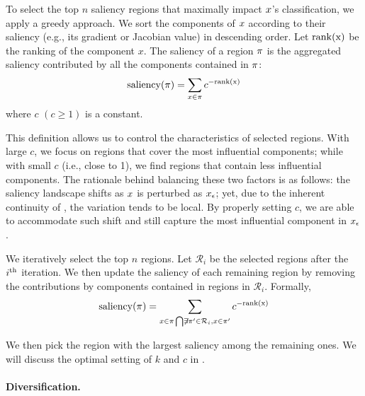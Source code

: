 To select the top $n$ saliency regions that maximally impact $x$'s classification, we apply a greedy approach.
We sort the components of $x$ according to their saliency (e.g., its gradient or Jacobian value) in descending order. Let $\rm{rank}(x)$ be the ranking of the component $x$. The saliency of a region $\pi$ is the aggregated saliency contributed by all the components contained in $\pi$:
\begin{displaymath}
{\rm saliency}(\pi) = \sum_{x \in \pi} c^{-\rm{rank}(x)}
\end{displaymath}
where $c$ $(c \geq 1)$ is a constant.

This definition allows us to control the characteristics of selected regions. With large $c$, we focus on regions that cover the most influential components; while with small $c$ (i.e., close to 1), we find regions that contain less influential components. The rationale behind balancing these two factors is as follows: the saliency landscape shifts as $x$ is perturbed as $x_{\epsilon}$; yet, due to the inherent continuity of \dnns, the variation tends to be local. By properly setting $c$, we are able to accommodate such shift and still capture the most influential component in $x_{\epsilon}$.

We iteratively select the top $n$ regions. Let $\mathcal{R}_i$ be the selected regions after the $i^{\rm th}$ iteration. We then update the saliency of each remaining region by removing the contributions by components contained in regions in $\mathcal{R}_i$. Formally,
\begin{displaymath}
    {\rm saliency}(\pi) = \sum_{x \in \pi \bigcap \not\exists \pi' \in \mathcal{R}_i, x \in \pi'} c^{-\rm{rank}(x)}
\end{displaymath}

We then pick the region with the largest saliency among the remaining ones. We will discuss the optimal setting of $k$ and $c$ in .





\paragraph*{Diversification.\;}
\label{sec:div}



